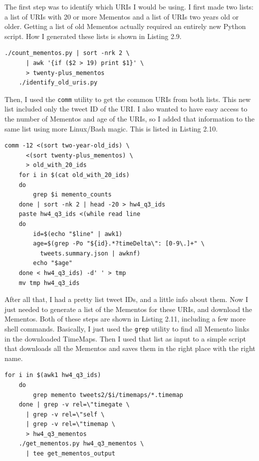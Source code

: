 \documentclass[a4paper,12pt]{article}
\begin{document}
The first step was to identify which URIs I would be using. I first made two lists: a list of URIs with
20 or more Mementos and a list of URIs two years old or older. Getting a list of old Mementos actually
required an entirely new Python script. 
How I generated these lists is shown in Listing 2.9. 

\begin{lstlisting}[basicstyle=\ttfamily,caption={Making Lists of URIs}]
    ./count_mementos.py | sort -nrk 2 \
      | awk '{if ($2 > 19) print $1}' \
      > twenty-plus_mementos
    ./identify_old_uris.py
\end{lstlisting}

Then, I used the \texttt{comm} utility to get the common URIs from both lists. This new list included only the
tweet ID of the URI. I also wanted to have easy access to the number of Mementos and age of the URIs, so I
added that information to the same list using more Linux/Bash magic. This is listed in Listing 2.10.

\begin{lstlisting}[basicstyle=\ttfamily,caption={Magicing More Columns}]
    comm -12 <(sort two-year-old_ids) \
      <(sort twenty-plus_mementos) \
      > old_with_20_ids
    for i in $(cat old_with_20_ids)
    do
        grep $i memento_counts
    done | sort -nk 2 | head -20 > hw4_q3_ids
    paste hw4_q3_ids <(while read line
    do
        id=$(echo "$line" | awk1)
        age=$(grep -Po "${id}.*?timeDelta\": [0-9\.]+" \
          tweets.summary.json | awknf)
        echo "$age"
    done < hw4_q3_ids) -d' ' > tmp
    mv tmp hw4_q3_ids
\end{lstlisting}

After all that, I had a pretty list tweet IDs, and a little info about them. Now I just needed to generate
a list of the Mementos for these URIs, and download the Mementos. Both of these steps are shown in Listing
2.11, including a few more shell commands. Basically, I just used the \texttt{grep} utility to find all
Memento links in the downloaded TimeMaps. Then I used that list as input to a simple script that downloads
all the Mementos and saves them in the right place with the right name.

\begin{lstlisting}[basicstyle=\ttfamily,caption={Getting Mementos}]
    for i in $(awk1 hw4_q3_ids)
    do
        grep memento tweets2/$i/timemaps/*.timemap
    done | grep -v rel=\"timegate \
      | grep -v rel=\"self \
      | grep -v rel=\"timemap \
      > hw4_q3_mementos
    ./get_mementos.py hw4_q3_mementos \
      | tee get_mementos_output
\end{lstlisting}
\end{document}
